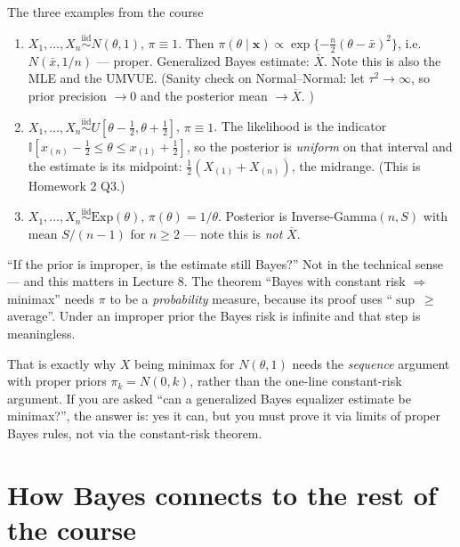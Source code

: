 \documentclass[11pt]{article}
\newcommand{\Xbar}{\overline{X}}
\newcommand{\iid}{\overset{\text{iid}}{\sim}}
\newcommand{\I}{\mathbb{I}}
\begin{document}
\begin{idea}{The three examples from the course}
\begin{enumerate}
\item $X_1,\dots,X_n\iid N(\theta,1)$, $\pi\equiv1$. Then
$\pi(\theta\mid\mathbf x)\propto\exp\{-\tfrac n2(\theta-\bar x)^2\}$, i.e.\
$N(\bar x,1/n)$ --- proper. Generalized Bayes estimate: $\boxed{\Xbar}$. Note this is also the
MLE and the UMVUE. (Sanity check on Normal--Normal: let $\tau^2\to\infty$, so prior precision
$\to0$ and the posterior mean $\to\Xbar$. \checkmark)
\item $X_1,\dots,X_n\iid U[\theta-\tfrac12,\theta+\tfrac12]$, $\pi\equiv1$. The likelihood is
the indicator $\I[x_{(n)}-\tfrac12\le\theta\le x_{(1)}+\tfrac12]$, so the posterior is
\emph{uniform} on that interval and the estimate is its midpoint:
$\boxed{\tfrac12(X_{(1)}+X_{(n)})}$, the midrange. (This is Homework 2 Q3.)
\item $X_1,\dots,X_n\iid\mathrm{Exp}(\theta)$, $\pi(\theta)=1/\theta$. Posterior is
Inverse-Gamma$(n,S)$ with mean $\boxed{S/(n-1)}$ for $n\ge2$ --- note this is \emph{not}
$\Xbar$.
\end{enumerate}
\end{idea}

\begin{confusion}{``If the prior is improper, is the estimate still Bayes?''}
Not in the technical sense --- and this matters in Lecture 8. The theorem ``Bayes with
constant risk $\Rightarrow$ minimax'' needs $\pi$ to be a \emph{probability} measure, because
its proof uses ``$\sup\ \ge$ average''. Under an improper prior the Bayes risk is infinite and
that step is meaningless.

That is exactly why $X$ being minimax for $N(\theta,1)$ needs the \emph{sequence} argument
with proper priors $\pi_k=N(0,k)$, rather than the one-line constant-risk argument. If you
are asked ``can a generalized Bayes equalizer estimate be minimax?'', the answer is: yes it
can, but you must prove it via limits of proper Bayes rules, not via the constant-risk
theorem.
\end{confusion}

\section{How Bayes connects to the rest of the course}
\end{document}
